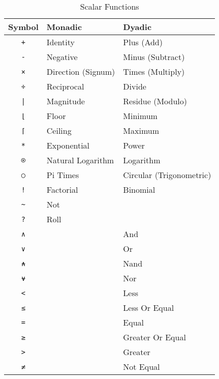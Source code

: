 \documentclass[numbers,preprint]{sigplanconf}
\begin{document}



\begin{table}
\centering
\begin{tabular}{cll}
\toprule
Symbol                   & Monadic            & Dyadic \\
\midrule
\texttt{+}               & Identity           & Plus (Add) \\
\texttt{-}               & Negative           & Minus (Subtract) \\
\texttt{×}               & Direction (Signum) & Times (Multiply) \\
\texttt{÷}               & Reciprocal         & Divide \\
\texttt{|}               & Magnitude          & Residue (Modulo) \\
\texttt{⌊}               & Floor              & Minimum \\
\texttt{⌈}               & Ceiling            & Maximum \\
\texttt{*}               & Exponential        & Power \\
\texttt{⍟}               & Natural Logarithm  & Logarithm \\
\texttt{○}               & Pi Times           & Circular (Trigonometric) \\
\texttt{!}               & Factorial          & Binomial \\
\texttt{\textasciitilde} & Not                & \\
\texttt{?}               & Roll               & \\
\texttt{∧}              &                    & And \\
\texttt{∨}               &                    & Or \\
\texttt{⍲}               &                    & Nand \\
\texttt{⍱}               &                    & Nor \\
\texttt{<}               &                    & Less \\
\texttt{≤}               &                    & Less Or Equal \\
\texttt{=}               &                    & Equal \\
\texttt{≥}               &                    & Greater Or Equal \\
\texttt{>}               &                    & Greater \\
\texttt{≠}               &                    & Not Equal \\
\end{tabular}
\caption{Scalar Functions}
\label{tab:scalarprims}
\end{table}
\end{document}
